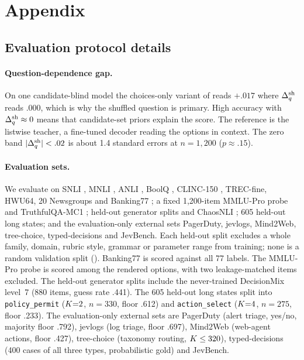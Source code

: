 \section{Appendix}

\subsection{Evaluation protocol details}
\label{app:protocol}

\paragraph{Question-dependence gap.} On one candidate-blind model the choices-only variant of
 reads $+.017$ where $\Delta_q^{\mathrm{sh}}$ reads $.000$, which is why the shuffled question is
primary. High accuracy with $\Delta_q^{\mathrm{sh}} \approx 0$ means that candidate-set priors explain the score. The
reference is the listwise teacher, a fine-tuned decoder reading the options in context. The zero band
$|\Delta_q^{\mathrm{sh}}| < .02$ is about 1.4 standard errors at $n{=}1{,}200$ ($p \approx .15$).

\paragraph{Evaluation sets.} We evaluate on SNLI \citep{bowman2015snli}, MNLI
\citep{williams2018mnli}, ANLI \citep{nie2020anli}, BoolQ \citep{clark2019boolq}, CLINC-150
\citep{larson2019clinc}, TREC-fine, HWU64, 20 Newsgroups and Banking77 \citep{casanueva2020banking77};
a fixed 1{,}200-item MMLU-Pro probe \citep{wang2024mmlupro} and TruthfulQA-MC1 \citep{lin2022truthfulqa};
held-out generator splits and ChaosNLI \citep{nie2020chaosnli}; 605 held-out long states; and the
evaluation-only external sets PagerDuty, jevlogs, Mind2Web, tree-choice, typed-decisions and JevBench.
\label{sec:setup:heldout}
Each held-out split excludes a whole family, domain, rubric style, grammar or parameter range from
training; none is a random validation split (). Banking77 is scored against all 77 labels. The MMLU-Pro probe is scored among
the rendered options, with two leakage-matched items excluded. The held-out generator splits include the
never-trained DecisionMix level~7 (880 items, guess rate .441). The 605 held-out long states split into
\texttt{policy\_permit} ($K{=}2$, $n{=}330$, floor .612) and \texttt{action\_select}
($K{=}4$, $n{=}275$, floor .233). The evaluation-only external sets are PagerDuty (alert triage, yes/no, majority floor .792),
jevlogs (log triage, floor .697), Mind2Web (web-agent actions, floor .427), tree-choice (taxonomy
routing, $K \le 320$), typed-decisions (400 cases of all three types, probabilistic gold) and
JevBench.

